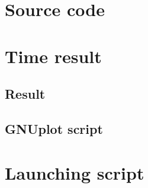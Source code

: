 \chapter{Source code}



\chapter{Time result}

\section{Result}


\section{GNUplot script}
\lstset{language=Gnuplot}


\chapter{Launching script}

\lstset{language=Ruby}

